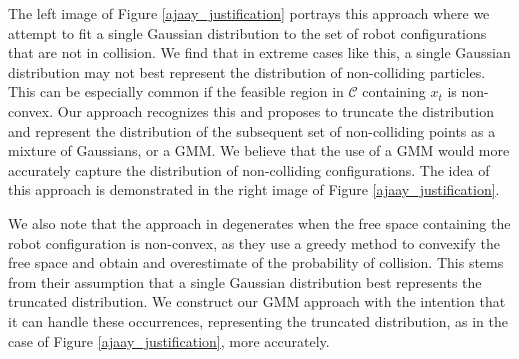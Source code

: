 \documentclass[journal]{IEEEtran}
\begin{document}
The left image of Figure \ref{ajaay_justification} portrays this approach where we attempt to fit a single Gaussian distribution to the set of robot configurations that are not in collision. We find that in extreme cases like this, a single Gaussian distribution may not best represent the distribution of non-colliding particles. This can be especially common if the feasible region in $\mathcal{C}$ containing $x_t$ is non-convex. Our approach recognizes this and proposes to truncate the distribution and represent the distribution of the subsequent set of non-colliding points as a mixture of Gaussians, or a GMM. We believe that the use of a GMM would more accurately capture the distribution of non-colliding configurations. The idea of this approach is demonstrated in the right image of Figure \ref{ajaay_justification}.

We also note that the approach in \cite{IEEEhowto:patil} degenerates when the free space containing the robot configuration is non-convex, as they use a greedy method to convexify the free space and obtain and overestimate of the probability of collision. This stems from their assumption that a single Gaussian distribution best represents the truncated distribution. We construct our GMM approach with the intention that it can handle these occurrences, representing the truncated distribution, as in the case of Figure \ref{ajaay_justification}, more accurately.
\end{document}
